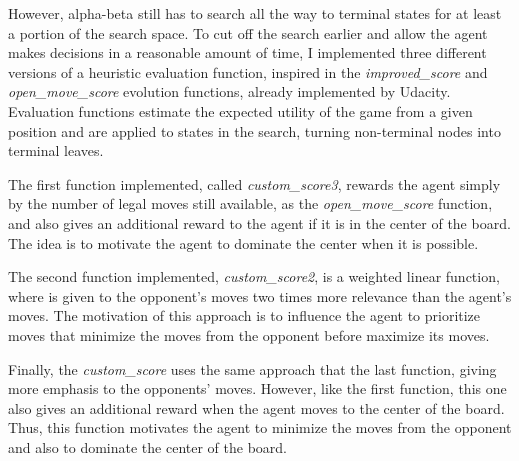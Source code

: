 \documentclass[a4paper]{article}
\begin{document}
However, alpha-beta still has to search all the way to terminal states for at least a portion of the search space. To cut off the search earlier and allow the agent makes decisions in a reasonable amount of time, I implemented three different versions of a heuristic evaluation function, inspired in the \textit{improved\_score} and \textit{open\_move\_score} evolution functions, already implemented by Udacity. Evaluation functions estimate the expected utility of the game from a given position and are applied to states in the search,  turning non-terminal nodes into terminal leaves.


The first function implemented, called \textit{custom\_score3}, rewards the agent simply by the number of legal moves still available, as the \textit{open\_move\_score} function, and also gives an additional reward to the agent if it is in the center of the board. The idea is to motivate the agent to dominate the center when it is possible.

The second function implemented, \textit{custom\_score2}, is a weighted linear function, where is given to the opponent's moves two times more relevance than the agent's moves. The motivation of this approach is to influence the agent to prioritize moves that minimize the moves from the opponent before maximize its moves.

Finally, the \textit{custom\_score} uses the same approach that the last function, giving more emphasis to the opponents' moves. However, like the first function, this one also gives an additional reward when the agent moves to the center of the board. Thus, this function motivates the agent to minimize the moves from the opponent and also to dominate the center of the board.


\end{document}
